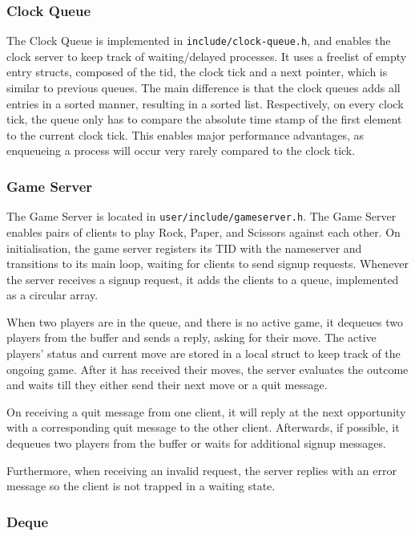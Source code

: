 \documentclass[12pt, titlepage]{article}
\begin{document}
    \subsubsection{Clock Queue}
    \label{sec:clock-queue}
    The Clock Queue is implemented in \verb`include/clock-queue.h`, and enables the clock server to keep track of waiting/delayed processes. 
    It uses a freelist of empty entry structs, composed of the tid, the clock tick and a next pointer, which is similar to previous queues. 
    The main difference is that the clock queues adds all entries in a sorted manner, resulting in a sorted list. 
    Respectively, on every clock tick, the queue only has to compare the absolute time stamp of the first element to the current clock tick. 
    This enables major performance advantages, as enqueueing a process will occur very rarely compared to the clock tick.   

    \subsubsection{Game Server}
    The Game Server is located in \verb`user/include/gameserver.h`.
    The Game Server enables pairs of clients to play Rock, Paper, and Scissors against each other.
    On initialisation, the game server registers its TID with the nameserver and transitions to its main loop, waiting for clients to send signup requests.
    Whenever the server receives a signup request, it adds the clients to a queue, implemented as a circular array.

    When two players are in the queue, and there is no active game, it dequeues two players from the buffer and sends a reply, asking for their move.
    The active players' status and current move are stored in a local struct to keep track of the ongoing game.
    After it has received their moves, the server evaluates the outcome and waits till they either send their next move or a quit message.

    On receiving a quit message from one client, it will reply at the next opportunity with a corresponding quit message to the other client.
    Afterwards, if possible, it dequeues two players from the buffer or waits for additional signup messages.

    Furthermore, when receiving an invalid request, the server replies with an error message so the client is not trapped in a waiting state.
    
    \subsubsection{Deque}
    \label{sec:deque}
    
\end{document}
